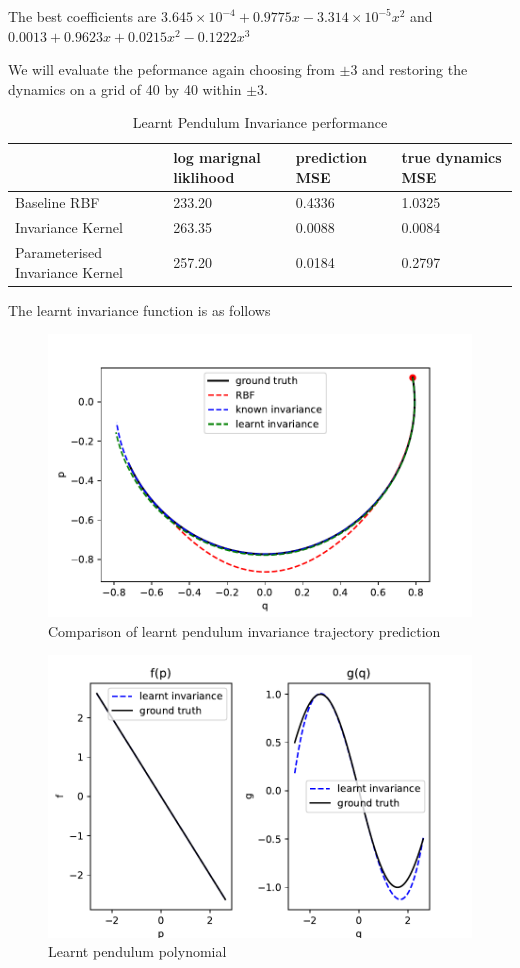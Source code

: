 \documentclass{statsmsc}
\begin{document}
The best coefficients are
$3.645\times 10^{-4} + 0.9775x -3.314\times 10^{-5} x^2$
and 
$0.0013+ 0.9623x + 0.0215x^2-0.1222x^3$


We will evaluate the peformance again choosing from $\pm 3$ and restoring the dynamics on a grid of 40 by 40 within $\pm 3$.
\begin{table}[H]
  \centering
  \begin{tabular}{l l l l }
    \hline
                    & log marignal liklihood &  prediction MSE  & true dynamics MSE\\
    \hline
Baseline RBF & 233.20 & 0.4336 & 1.0325 \\
Invariance Kernel & 263.35 & 0.0088 & 0.0084 \\
Parameterised Invariance Kernel & 257.20 & 0.0184 & 0.2797 \\
    \hline
  \end{tabular}
  \caption{Learnt Pendulum Invariance performance}
  \label{tab:paramertised_pendulum_performance}
\end{table}
The learnt invariance function is as follows

\begin{figure}[H] 
  \includegraphics[width=0.6\linewidth]{../codes/figures/parameterised_pendulum_predicted_trajectory.pdf}
  \centering
  \caption{Comparison of learnt pendulum invariance trajectory prediction}
  \label{fig:parameterised_pendulum_trajectory}
\end{figure}

\begin{figure}[H] 
  \includegraphics[width=0.6\linewidth]{../codes/figures/parameterised_pendulum_learnt_polynomial.pdf}
  \centering
  \caption{Learnt pendulum polynomial}
  \label{fig:parameterised_pendulum_polynomial}
\end{figure}
\end{document}
